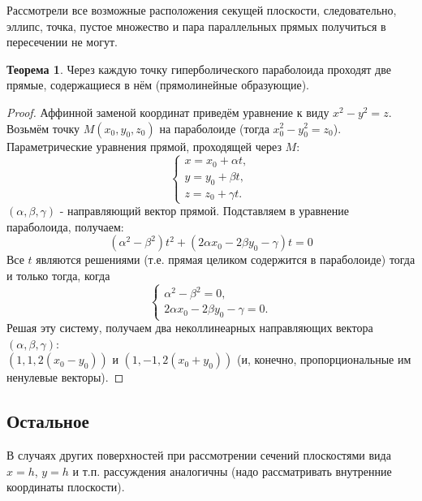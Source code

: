 \documentclass[a4paper, 12pt]{article}
\theoremstyle{definition}
\newtheorem*{theorem}{Теорема}
\begin{document}
Рассмотрели все возможные расположения секущей плоскости, следовательно, эллипс, точка, пустое множество и пара параллельных прямых получиться в пересечении не могут.

\begin{theorem}
    Через каждую точку гиперболического параболоида проходят две прямые, содержащиеся в нём (прямолинейные образующие).
\end{theorem}
\begin{proof}
    Аффинной заменой координат приведём уравнение к виду $x^2 - y^2 = z$.
    Возьмём точку $M(x_0, y_0, z_0)$ на параболоиде (тогда $x_0^2 - y_0^2 = z_0$).
    Параметрические уравнения прямой, проходящей через $M$:
    \[\begin{cases}
        x = x_0 + \alpha t, \\
        y = y_0 + \beta t, \\
        z = z_0 + \gamma t.
    \end{cases}\]
    $(\alpha, \beta, \gamma)$ - направляющий вектор прямой.
    Подставляем в уравнение параболоида, получаем:
    \[(\alpha^2 - \beta^2)t^2 + (2 \alpha x_0 - 2 \beta y_0 - \gamma)t = 0\]
    Все $t$ являются решениями (т.е. прямая целиком содержится в параболоиде) тогда и только тогда, когда
    \[\begin{cases}
        \alpha^2 - \beta^2 = 0, \\
        2 \alpha x_0 - 2 \beta y_0 - \gamma = 0.
    \end{cases}\]
    Решая эту систему, получаем два неколлинеарных направляющих вектора $(\alpha, \beta, \gamma)$: \\ $(1, 1, 2(x_0 - y_0))$ и $(1, -1, 2(x_0 + y_0))$ (и, конечно, пропорциональные им ненулевые векторы).
\end{proof}


\subsection{Остальное}
В случаях других поверхностей при рассмотрении сечений плоскостями вида $x = h$, $y = h$ и т.п. рассуждения аналогичны (надо рассматривать внутренние координаты плоскости).
\end{document}
